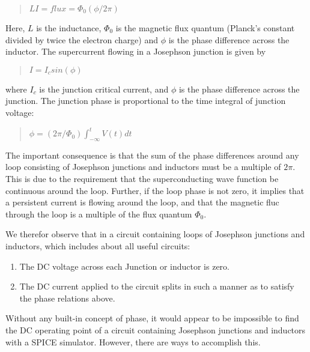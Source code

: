 \begin{quote}
$LI = flux = \Phi_0(\phi/2\pi)$
\end{quote}

Here, $L$ is the inductance, $\Phi_0$ is the magnetic flux quantum
(Planck's constant divided by twice the electron charge) and $\phi$ is
the phase difference across the inductor.  The supercurrent flowing in
a Josephson junction is given by

\begin{quote}
$I = I_c sin(\phi)$
\end{quote}

where $I_c$ is the junction critical current, and $\phi$ is the phase
difference across the junction.  The junction phase is proportional to
the time integral of junction voltage:

\begin{quote}
$\phi = (2\pi/\Phi_0)\int^t_{-\infty} V(t)dt$
\end{quote}

The important consequence is that the sum of the phase differences
around any loop consisting of Josephson junctions and inductors must
be a multiple of $2\pi$.  This is due to the requirement that the
superconducting wave function be continuous around the loop.  Further,
if the loop phase is not zero, it implies that a persistent current is
flowing around the loop, and that the magnetic fluc through the loop
is a multiple of the flux quantum $\Phi_0$.

We therefor observe that in a circuit containing loops of Josephson
junctions and inductors, which includes about all useful circuits:

\begin{enumerate}
\item{The DC voltage across each Junction or inductor is zero.}
\item{The DC current applied to the circuit splits in such a manner
as to satisfy the phase relations above.}
\end{enumerate}

Without any built-in concept of phase, it would appear to be
impossible to find the DC operating point of a circuit containing
Josephson junctions and inductors with a SPICE simulator.  However,
there are ways to accomplish this.

